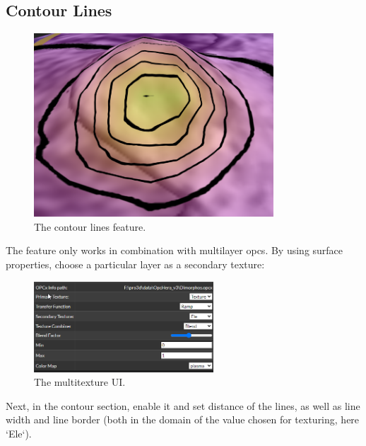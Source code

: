\newpage
\subsection{Contour Lines}
\label{sec:contourLines}

\begin{figure}[h!]
	\centering
	\includegraphics[width=0.8\textwidth]{pics/contourTeaser.png}
	\caption{The contour lines feature.}
\end{figure}

The feature only works in combination with multilayer opcs. By using surface properties, choose a particular layer as a secondary texture:

\begin{figure}[h!]
	\centering
	\includegraphics[width=0.6\textwidth]{pics/multitexture-ui.png}
	\caption{The multitexture UI.}
\end{figure}

Next, in the contour section, enable it and set distance of the lines, as well as line width and line border (both in the domain of the value chosen for texturing, here `Ele`).

